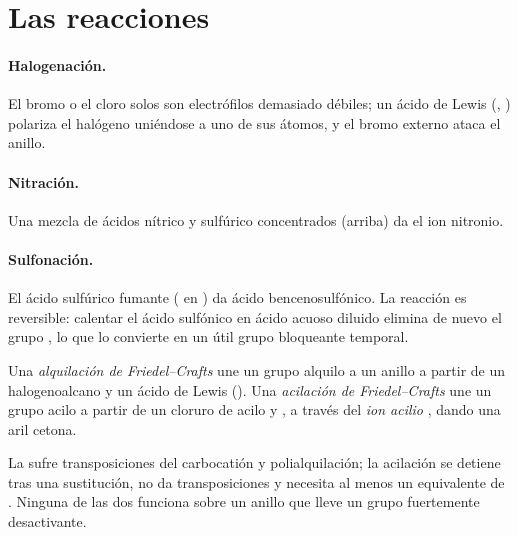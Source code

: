 \section{Las reacciones}

\paragraph{Halogenación.} El bromo o el cloro solos son electrófilos demasiado débiles; un ácido de Lewis
(, ) polariza el halógeno uniéndose a uno de sus átomos, y el bromo
externo ataca el anillo.

\paragraph{Nitración.} Una mezcla de ácidos nítrico y sulfúrico concentrados (arriba) da el
ion nitronio.

\paragraph{Sulfonación.} El ácido sulfúrico fumante ( en ) da ácido bencenosulfónico.
La reacción es reversible: calentar el ácido sulfónico en ácido acuoso diluido elimina de nuevo el
grupo , lo que lo convierte en un útil grupo bloqueante temporal.

\begin{definition}\label{def:b2:aromatic-substitution:friedel-crafts}
Una \emph{alquilación de Friedel--Crafts} une un grupo alquilo
a un anillo  a partir de un halogenoalcano y un ácido de Lewis (). Una
\emph{acilación de Friedel--Crafts} une un grupo acilo
 a partir de un cloruro de acilo y , a través del \emph{ion acilio}
, dando una aril cetona.
\end{definition}

\begin{proposition}\label{prop:b2:aromatic-substitution:friedel-crafts-limits}
La  sufre transposiciones del carbocatión y
polialquilación; la acilación se detiene tras una sustitución, no da transposiciones y necesita al
menos un equivalente de . Ninguna de las dos funciona sobre un anillo que lleve un grupo fuertemente
desactivante.
\end{proposition}

